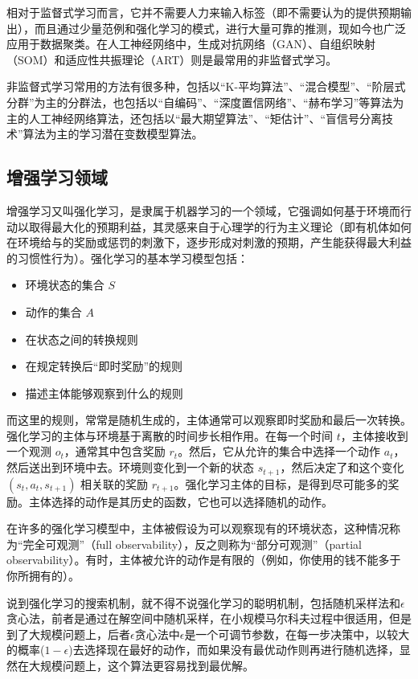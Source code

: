 \documentclass{misc/elegantpaper}
\begin{document}
相对于监督式学习而言，它并不需要人力来输入标签（即不需要认为的提供预期输出），而且通过少量范例和强化学习的模式，进行大量可靠的推测，现如今也广泛应用于数据聚类。在人工神经网络中，生成对抗网络（GAN）、自组织映射（SOM）和适应性共振理论（ART）则是最常用的非监督式学习。

非监督式学习常用的方法有很多种，包括以“K-平均算法”、“混合模型”、“阶层式分群”为主的分群法，也包括以“自编码”、“深度置信网络”、“赫布学习”等算法为主的人工神经网络算法，还包括以“最大期望算法”、“矩估计”、“盲信号分离技术”算法为主的学习潜在变数模型算法。

\subsection{增强学习领域}

增强学习又叫强化学习，是隶属于机器学习的一个领域，它强调如何基于环境而行动以取得最大化的预期利益，其灵感来自于心理学的行为主义理论（即有机体如何在环境给与的奖励或惩罚的刺激下，逐步形成对刺激的预期，产生能获得最大利益的习惯性行为）。强化学习的基本学习模型包括：
\begin{itemize}[noitemsep]
      \item 环境状态的集合 $S$
      \item 动作的集合 $A$
      \item 在状态之间的转换规则
      \item 在规定转换后“即时奖励”的规则
      \item 描述主体能够观察到什么的规则
\end{itemize}

而这里的规则，常常是随机生成的，主体通常可以观察即时奖励和最后一次转换。强化学习的主体与环境基于离散的时间步长相作用。在每一个时间 $t$，主体接收到一个观测 $o_t$，通常其中包含奖励 $r_t$。然后，它从允许的集合中选择一个动作 $a_t$，然后送出到环境中去。环境则变化到一个新的状态 $s_{t+1}$，然后决定了和这个变化 $(s_t,a_t,s_{t+1})$ 相关联的奖励 $r_{t+1}$。强化学习主体的目标，是得到尽可能多的奖励。主体选择的动作是其历史的函数，它也可以选择随机的动作。

在许多的强化学习模型中，主体被假设为可以观察现有的环境状态，这种情况称为“完全可观测”（full observability），反之则称为“部分可观测”（partial observability）。有时，主体被允许的动作是有限的（例如，你使用的钱不能多于你所拥有的）。

说到强化学习的搜索机制，就不得不说强化学习的聪明机制，包括随机采样法和$\epsilon$贪心法，前者是通过在解空间中随机采样，在小规模马尔科夫过程中很适用，但是到了大规模问题上，后者$\epsilon$贪心法中$\epsilon$是一个可调节参数，在每一步决策中，以较大的概率($1-\epsilon$)去选择现在最好的动作，而如果没有最优动作则再进行随机选择，显然在大规模问题上，这个算法更容易找到最优解。
\end{document}
